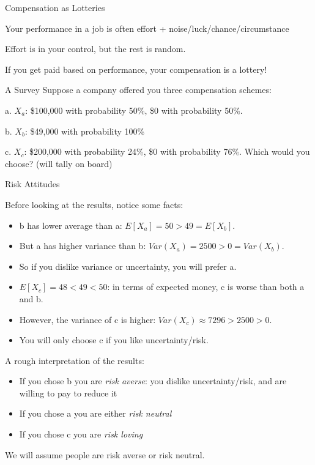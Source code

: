 \documentclass[aspectratio=169,usenames,dvipsnames]{beamer}
\newenvironment{wideitemize}{\itemize\addtolength{\itemsep}{10pt}}{\enditemize}
\begin{document}
\begin{frame}{Compensation as Lotteries}

\begin{wideitemize}
    \item Your performance in a job is often effort + noise/luck/chance/circumstance
    \item Effort is in your control, but the rest is random.
    \item If you get paid based on performance, your compensation is a lottery!
\end{wideitemize}
    
\end{frame}
\begin{frame}{A Survey}
    Suppose a company offered you three compensation schemes:
    \begin{wideitemize}
        \item[a.] $X_a$: \$100,000 with probability 50\%, \$0 with probability 50\%.
        \item[b.] $X_b$: \$49,000 with probability 100\%
        \item[c.] $X_c$: \$200,000 with probability 24\%, \$0 with probability 76\%.
    \end{wideitemize}
    Which would you choose? (will tally on board)
\end{frame}

\begin{frame}{Risk Attitudes}
    \begin{wideitemize}
        \item Before looking at the results, notice some facts:
        \begin{itemize}
            \item b has lower average than a: $E[X_a]=50>49=E[X_b]$. 
            \item But a has higher variance than b: $Var(X_a)=2500>0=Var(X_b)$.
            \item So if you dislike variance or uncertainty, you will prefer a.
            \item $E[X_c]=48<49<50$: in terms of expected money, c is worse than both a and b.
            \item However, the variance of c is higher: $Var(X_c) \approx 7296>2500>0$.
            \item You will only choose c if you like uncertainty/risk.
        \end{itemize}
        \item A rough interpretation of the results:
        \begin{itemize}
            \item If you chose b you are \textit{risk averse}: you dislike uncertainty/risk, and are willing to pay to reduce it
            \item If you chose a you are either \textit{risk neutral}
            \item If you chose c you are \textit{risk loving}
        \end{itemize}
    \item We will assume people are risk averse or risk neutral.
    \end{wideitemize}
\end{frame}
\end{document}
